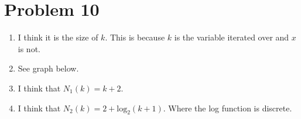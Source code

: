 \documentclass{article}
\begin{document}
\section{Problem 10}
\begin{enumerate}
    \item I think it is the size of $k$. This is because $k$ is the variable
        iterated over and $x$ is not.
    \item See graph below.
    \item I think that $N_1(k) = k + 2$.
    \item I think that $N_2(k) = 2 + \text{log}_2(k + 1)$. Where the log 
        function is discrete.
\end{enumerate}
\setlength{\unitlength}{0.240900pt}
\ifx\plotpoint\undefined\newsavebox{\plotpoint}\fi
\sbox{\plotpoint}{\rule[-0.200pt]{0.400pt}{0.400pt}}%
\end{document}
